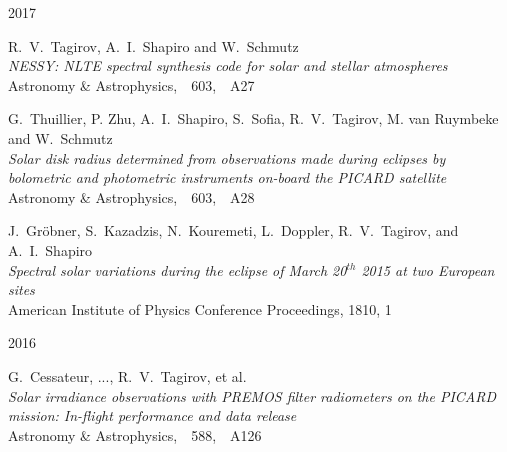 

\begin{cventries}

  \cventry
    {}     %
    {}     %
    {}     %
    {2017} %
    {
      \begin{cvitems} %
        \item {R.~V.~Tagirov, A.~I.~Shapiro and W.~Schmutz\\
               \textit{NESSY: NLTE spectral synthesis code for solar and stellar atmospheres}\\
               Astronomy \& Astrophysics,\ \ 603,\ \ A27}\\
        \item {G.~Thuillier, P. Zhu, A.~I.~Shapiro, S.~Sofia, R.~V.~Tagirov, M. van Ruymbeke and W.~Schmutz\\
              \textit{Solar disk radius determined from observations made during eclipses by bolometric and photometric instruments on-board the PICARD satellite}\\
               Astronomy \& Astrophysics,\ \ 603,\ \ A28}\\
        \item {J.~Gr\"{o}bner, S.~Kazadzis, N.~Kouremeti, L.~Doppler, R.~V.~Tagirov, and A.~I.~Shapiro\\
              \textit{Spectral solar variations during the eclipse of March 20$^{th}$ 2015 at two European sites}\\
              American Institute of Physics Conference Proceedings, 1810, 1}
      \end{cvitems}
    }

  \cventry
    {}     %
    {}     %
    {}     %
    {2016} %
    {
      \begin{cvitems} %
        \item {G.~Cessateur, ..., R.~V.~Tagirov, et al.\\
               \textit{Solar irradiance observations with PREMOS filter radiometers on the PICARD mission: In-flight performance and data release}\\
               Astronomy \& Astrophysics,\ \ 588,\ \ A126}
      \end{cvitems}
    }


\end{cventries}
